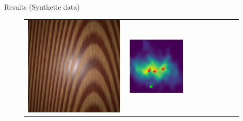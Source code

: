 \documentclass[final]{beamer}
\newlength{\twocolwid}
\newlength{\resultwidth}
\begin{document}
\begin{frame}[t]
\begin{columns}[t]
\begin{column}{\twocolwid}
\begin{block}{Results (Synthetic data)}
\begin{figure}[t]
\begin{tabular}{ccrclcccc}
            		\includegraphics[width=\resultwidth]{synth/wood/optim.jpg} &
            		\includegraphics[width=\resultwidth]{synth/wood/posterior.pdf} &

\end{tabular}
\end{figure}
\end{block}
\end{column}
\end{columns}
\end{frame}
\end{document}
